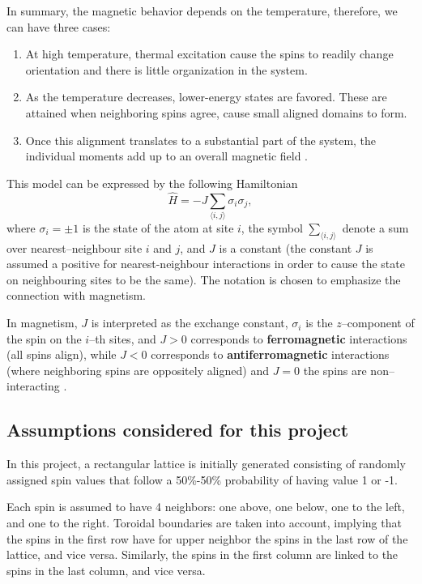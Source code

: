\documentclass[
    10pt,
    journal,
    compsoc,
    english
]{IEEEtran}
\begin{document}
In summary, the magnetic behavior depends on the temperature, therefore, we can have three cases:
\begin{enumerate}
    \item At high temperature, thermal excitation cause the spins to readily change orientation and there is little organization in the system.
    \item As the temperature decreases, lower-energy states are favored. These are attained when neighboring spins agree, cause small aligned domains to form.
    \item Once this alignment translates to a substantial part of the system, the individual moments add up to an overall magnetic field \cite{MicrosoftIsingModel}.
\end{enumerate}

This model can be expressed by the following Hamiltonian 
\begin{equation*}
    \hat{H} = -J\sum_{\langle i,j \rangle} \sigma_i\sigma_j,
\end{equation*}
where $\sigma_i = \pm 1$ is the state of the atom at site $i$, the symbol $\sum_{\langle i,j \rangle}$ denote a sum over nearest--neighbour site $i$ and $j$, and $J$ is a constant (the constant $J$ is assumed a positive for nearest-neighbour interactions in order to cause the state on neighbouring sites to be the same). The notation is chosen to emphasize the connection with magnetism.

In magnetism, $J$ is interpreted as the exchange constant, $\sigma_i$ is the $z$--component of the spin on the $i$--th sites, and $J > 0$ corresponds to \textbf{ferromagnetic} interactions (all spins align), while $J < 0$ corresponds to \textbf{antiferromagnetic} interactions (where neighboring spins are oppositely aligned) \cite{Blundell} and $J = 0$ the spins are non--interacting \cite{IsingModelEn}.

\subsection{Assumptions considered for this project}
In this project, a rectangular lattice is initially generated consisting of randomly assigned spin values that follow a 50\%-50\% probability of having value 1 or -1.

Each spin is assumed to have 4 neighbors: one above, one below, one to the left, and one to the right. Toroidal boundaries are taken into account, implying that the spins in the first row have for upper neighbor the spins in the last row of the lattice, and vice versa. Similarly, the spins in the first column are linked to the spins in the last column, and vice versa.
\end{document}
